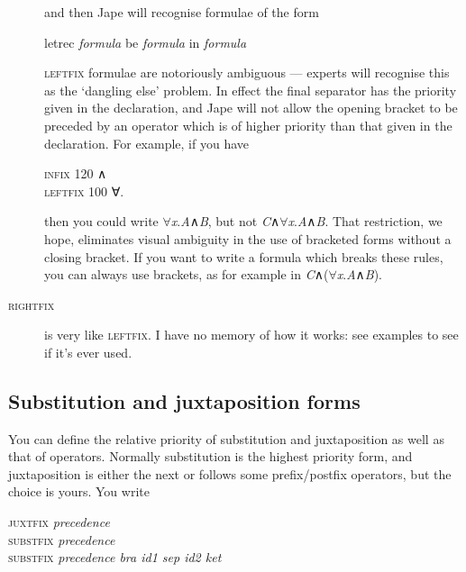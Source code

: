 \begin{description}
and then Jape will recognise formulae of the form

\begin{japeish}
letrec \textit{formula} be \textit{formula} in \textit{formula}
\end{japeish}

\textsc{leftfix} formulae are notoriously ambiguous --- experts will recognise this as the `dangling else' problem. In effect the final separator has the priority given in the declaration, and Jape will not allow the opening bracket to be preceded by an operator which is of higher priority than that given in the declaration. For example, if you have

\begin{japeish}
\textsc{infix 120} \textsc{∧}\\
\textsc{leftfix 100} ∀.
\end{japeish}

then you could write \ensuremath{\forall}\textit{x}.\textit{A}\textsc{∧}\textit{B}, but not \textit{C}\textsc{∧}\ensuremath{\forall}\textit{x}.\textit{A}\textsc{∧}\textit{B}. That restriction, we hope, eliminates visual ambiguity in the use of bracketed forms without a closing bracket. If you want to write a formula which breaks these rules, you can always use brackets, as for example in \textit{C}\textsc{∧}(\ensuremath{\forall}\textit{x}.\textit{A}\textsc{∧}\textit{B}).

\item [\textsc{rightfix}] is very like \textsc{leftfix}. I have no memory of how it works: see examples to see if it's ever used.
\end{description}

\subsection{Substitution and juxtaposition forms}

You can define the relative priority of substitution and juxtaposition as well as that of operators. Normally substitution is the highest priority form, and juxtaposition is either the next or follows some prefix/postfix operators, but the choice is yours. You write

\begin{japeish}
\textsc{juxtfix} \textit{precedence}\\
\textsc{substfix} \textit{precedence}\\
\textsc{substfix} \textit{precedence bra id1 sep id2 ket}
\end{japeish}


